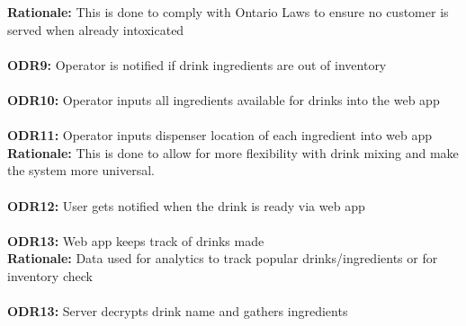 \documentclass{article}
\begin{document}
    \textbf{Rationale:} This is done to comply with Ontario Laws to ensure no customer is served when already intoxicated\\\\
    \textbf{ODR9:} Operator is notified if drink ingredients are out of inventory\\\\
    \textbf{ODR10:} Operator inputs all ingredients available for drinks into the web app\\\\
    \textbf{ODR11:} Operator inputs dispenser location of each ingredient into web app\\

    \textbf{Rationale:} This is done to allow for more flexibility with drink mixing and make the system more universal.\\\\
    \textbf{ODR12:} User gets notified when the drink is ready via web app\\\\
    \textbf{ODR13:} Web app keeps track of drinks made\\

    \textbf{Rationale:} Data used for analytics to track popular drinks/ingredients or for inventory check\\\\
    \textbf{ODR13:} Server decrypts drink name and gathers ingredients\\\\
\end{document}
